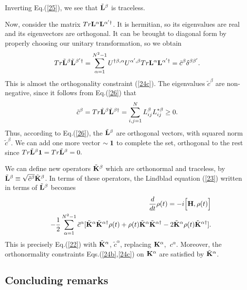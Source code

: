 \documentclass[aps,pra,amssymb, amsfonts,amsmath,showpacs, superscriptaddress,12pt]{revtex4}
\begin{document}
Inverting Eq.(\ref{25}), we see that $\tilde{\bf L}^{\beta}$ is traceless. 

Now, consider the matrix $Tr{\bf L}^{\alpha}{\bf L}^{\alpha'\dagger}$.  It is hermitian, so its eigenvalues are real and its eigenvectors are orthogonal.  It can be brought to diagonal form by properly choosing our unitary transformation, so we obtain
\begin{equation}\label{26}
Tr \tilde{\bf L}^{\beta}\tilde{\bf L}^{\beta'\dagger}=\sum_{\alpha=1}^{N^{2}-1}U^{\dagger\beta, \alpha} U^{\alpha', \beta}Tr{\bf L}^{\alpha}{\bf L}^{\alpha'\dagger}=\tilde c^{\beta}\delta^{\beta\beta'}.
\end{equation}
This is almost the orthogonality constraint  (\ref{24c}).  The eigenvalues $\tilde c^{\beta}$ are non-negative, since it follows from Eq.(\ref{26}) that 
\[
\tilde c^{\beta}=Tr \tilde{\bf L}^{\beta}\tilde{\bf L}^{\beta\dagger}= \sum_{i,j=1}^{N}L_{ij}^{\beta}L_{ij}^{*\beta}\geq 0.
\]
Thus, according to Eq.(\ref{26}), the $\tilde{\bf L}^{\beta}$  are orthogonal vectors, 
with squared norm $\tilde c^{\beta}$.  We can add one more vector $\sim {\bf 1}$ to complete the set, orthogonal to the rest since $Tr \tilde{\bf L}^{\beta}{\bf 1}=Tr \tilde{\bf L}^{\beta}=0.$

We can define  new operators $\tilde{\bf K}^{\beta}$ which are orthonormal and traceless, by $\tilde{\bf L}^{\beta}\equiv\sqrt{\tilde c^{\beta}}\tilde{\bf K}^{\beta}$.  In terms of these operators, the Lindblad equation (\ref{23}) written in terms of $\tilde{\bf L}^{\beta}$ becomes
\begin{eqnarray}\label{27}
&&\frac{d}{dt}{\bf\rho}(t)=-i\Big[{\bf H}, {\bf\rho}(t)\Big]\nonumber\\
&&-\frac{1}{2}\sum_{\alpha=1}^{N^{2}-1}\tilde c^{\alpha}[\tilde{\bf K}^{\alpha}\tilde{\bf K}^{\alpha\dagger} {\bf\rho}(t)+ {\bf\rho}(t)\tilde{\bf K}^{\alpha}\tilde{\bf K}^{\alpha\dagger}-2\tilde{\bf K}^{\alpha}{\bf\rho}(t)\tilde{\bf K}^{\alpha\dagger}].\nonumber\\
 \end{eqnarray}
\noindent This is precisely Eq.(\ref{22}) with $\tilde{\bf K}^{\alpha}$, $\tilde c^{\alpha}$, replacing ${\bf K}^{\alpha}$, $\ c^{\alpha}$.  Moreover, the orthonormality constraints Eqs.(\ref{24b},\ref{24c}) on ${\bf K}^{\alpha}$ are satisfied by $\tilde{\bf K}^{\alpha}$.  

\subsection{Concluding remarks}
 
\end{document}
